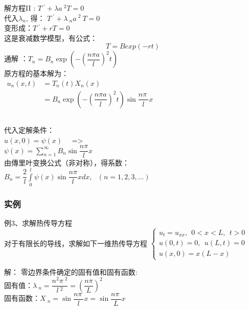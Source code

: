 \begin{frame}
	\frametitle{}	
	解方程II : 	$\displaystyle  T~^{'} +\lambda {a~^2 T}=0 $ \\ 
	代入$\lambda_n$, 得：
	$\displaystyle  T~^{'} +\lambda~_n a~^2 ~T=0 $ \\
	变形成：$\displaystyle  T~^{'} + rT=0 $ \\ \vspace{0.6em}
	这是衰减数学模型，有公式：
	\begin{equation*}
		T= Bexp(-rt)
	\end{equation*}
	通解 ：$\displaystyle T_n=B_n  \exp(-(\dfrac{n\pi a}{l})^2 t)$ \\  
	原方程的基本解为：\\ \vspace{0.3cm}
	$\begin{array}{llll}
		u_n(x,t) &= T_n(t)X_n(x)\\
		&= B_n  \exp(-(\dfrac{n\pi a}{l})^2 t) \sin \dfrac{n\pi~}{l} x \\
	\end{array}$ \\ 
\end{frame}	

\begin{frame}
	\frametitle{}	
	代入定解条件：\\ 
	$ \displaystyle u(x,0)= \psi(x)$ ~~=> \\
	$\psi (x)=\sum\limits_{n=1}^{\infty } B_n \sin \dfrac{ n\pi }{l} x$\\  
	由傳里叶变换公式（非对称），得系数：\\  
	$ \displaystyle B_n=  \dfrac{2}{l}\int\limits_{0 }^{l}  \psi (x) \sin \dfrac{ n\pi }{l} x dx , ~~~ (n=1,2,3,...) $\\   
\end{frame}	

\begin{frame}
	\frametitle{实例}
	\begin{exampleblock} {例3、求解热传导方程}
		~\\
	对于有限长的导线，求解如下一维热传导方程 
	$\displaystyle \begin{cases}
		u_{t} =u_{xx} ,~~ 0<x<L, ~~t>0\\
		u(0,t) =0, ~~u(L,t)=0 \\
		u(x,0) =x(L-x)
	\end{cases}$ \\
	\end{exampleblock}
	\alert{解：} 
	零边界条件确定的固有值和固有函数:\\
	固有值：$\displaystyle  \lambda~_n=\dfrac{n^2\pi~^2}{l~^2 }= (\dfrac{n\pi }{L}) ^2$ \\ 
	固有函数：$\displaystyle  X~_n=\sin \dfrac{n\pi~}{l} x=\sin \dfrac{n\pi~}{L} x $\\	
\end{frame}	

